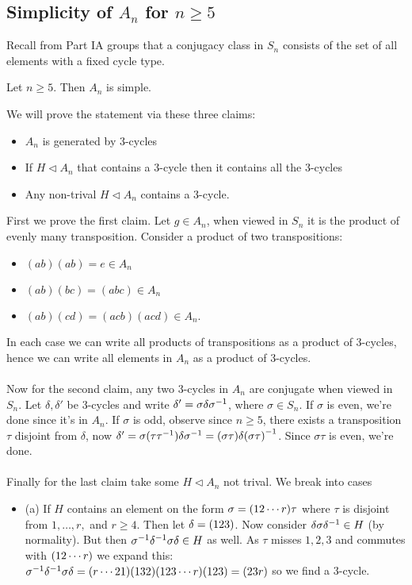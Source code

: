 \documentclass{article}
\newcommand{\nrm}{\triangleleft}
\begin{document}
\begin{itemize}
\subsection{Simplicity of $ A_n $ for $ n\ge 5 $}
Recall from Part IA groups that a conjugacy class in $ S_n $ consists of the set of all elements with a fixed cycle type.
\begin{theorem}
  Let $ n\ge 5 $. Then $ A_n $ is simple.
\end{theorem}
\pf We will prove the statement via these three claims:
\begin{itemize}
	\item $ A_n $ is generated by 3-cycles
	\item If $ H\nrm A_n $ that contains a 3-cycle then it contains all the 3-cycles
	\item Any non-trival $ H\nrm A_n $ contains a 3-cycle.
\end{itemize}
First we prove the first claim. Let $ g\in A_n $, when viewed in $ S_n $ it is the product of evenly many transposition. Consider a product of two transpositions:
\begin{itemize}
	\item $ (ab)(ab)=e\in A_n $
	\item $ (ab)(bc)=(abc)\in A_n $
	\item $ (ab)(cd)=(acb)(acd)\in A_n $.
\end{itemize}
In each case we can write all products of transpositions as a product of 3-cycles, hence we can write all elements in $ A_n $ as a product of 3-cycles.\\\\
Now for the second claim, any two 3-cycles in $ A_n $ are conjugate when viewed in $ S_n $. Let $ \delta, \delta' $ be 3-cycles and write $ \delta' =\sigma\delta{\sigma}^{-1} $, where $ \sigma\in S_n $. If $ \sigma $ is even, we're done since it's in $ A_n $. If $ \sigma $ is odd, observe since $ n\ge 5 $, there exists a transposition $ \tau $ disjoint from $ \delta $, now $ \delta'=\sigma(\tau{\tau}^{-1})\delta{\sigma}^{-1}=(\sigma\tau)\delta{(\sigma\tau)}^{-1} $. Since $ \sigma\tau $ is even, we're done.\\\\
Finally for the last claim take some $ H\nrm A_n $ not trival. We break into cases
\begin{itemize}
	\item (a) If $ H $ contains an element on the form $ \sigma=(1\space 2\cdots r)\tau $ where $ \tau $ is disjoint from $ 1,\dots, r, $ and $ r\ge 4 $. Then let $ \delta = (1\space2\space3) $. Now consider $ \delta\sigma{\delta}^{-1}\in H $ (by normality). But then $ {\sigma}^{-1}{\delta}^{-1}\sigma\delta\in H $ as well. As $ \tau $ misses $ 1,2,3 $ and commutes with $ (1\space2\cdots r) $ we expand this: $ {\sigma}^{-1}{\delta}^{-1}\sigma\delta=(r\cdots 2\space 1)(1\space 3\space 2)(1\space 2\space 3\cdots r)(1\space 2\space 3)=(2\space 3\space r) $ so we find a 3-cycle.

\end{itemize}
\end{itemize}
\end{document}
